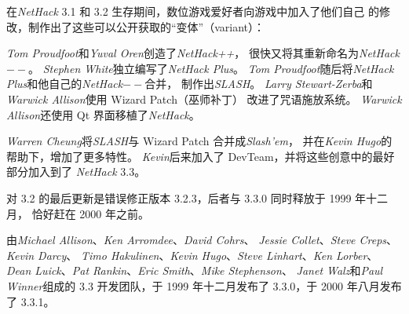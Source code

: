 \documentclass[a4paper, 10pt]{article}
\begin{document}
\medskip
在{\it NetHack\/} 3.1 和 3.2 生存期间，数位游戏爱好者向游戏中加入了他们自己
的修改，制作出了这些可以公开获取的“变体”（variant）：

\medskip
{\it Tom Proudfoot}和{\it Yuval Oren}创造了{\it NetHack++}，
很快又将其重新命名为{\it NetHack$--$}。
{\it Stephen White}独立编写了{\it NetHack Plus}。
{\it Tom Proudfoot}随后将{\it NetHack Plus}和他自己的{\it NetHack$--$}合并，
制作出{\it SLASH}。
{\it Larry Stewart-Zerba}和{\it Warwick Allison}使用 Wizard Patch（巫师补丁）
改进了咒语施放系统。
{\it Warwick Allison}还使用 Qt 界面移植了{\it NetHack}。

\medskip
{\it Warren Cheung}将{\it SLASH}与 Wizard Patch 合并成{\it Slash'em\/}，
并在{\it Kevin Hugo}的帮助下，增加了更多特性。
{\it Kevin}后来加入了 DevTeam，并将这些创意中的最好部分加入到了
{\it NetHack} 3.3。

\medskip
对 3.2 的最后更新是错误修正版本 3.2.3，后者与 3.3.0 同时释放于 1999 年十二月，
恰好赶在 2000 年之前。

\medskip
由{\it Michael Allison}、{\it Ken Arromdee}、{\it David Cohrs}、
{\it Jessie Collet}、{\it Steve Creps}、{\it Kevin Darcy}、
{\it Timo Hakulinen}、{\it Kevin Hugo}、{\it Steve Linhart}、{\it Ken Lorber}、
{\it Dean Luick}、{\it Pat Rankin}、{\it Eric Smith}、{\it Mike Stephenson}、
{\it Janet Walz}和{\it Paul Winner}组成的 3.3 开发团队，于 1999 年十二月发布了
3.3.0，于 2000 年八月发布了 3.3.1。
\end{document}
